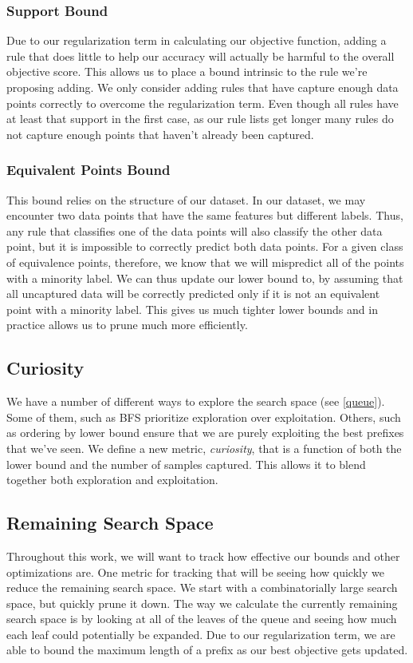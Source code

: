 \documentclass[]{article}
\theoremstyle{definition}
\begin{document}
\subsubsection{Support Bound}
Due to our regularization term in calculating our objective function, adding a rule that does little to help our accuracy will actually be harmful to the overall objective score.
This allows us to place a bound intrinsic to the rule we're proposing adding.
We only consider adding rules that have capture enough data points correctly to overcome the regularization term.
Even though all rules have at least that support in the first case, as our rule lists get longer many rules do not capture enough points that haven't already been captured.

\subsubsection{Equivalent Points Bound}
This bound relies on the structure of our dataset.
In our dataset, we may encounter two data points that have the same features but different labels.
Thus, any rule that classifies one of the data points will also classify the other data point, but it is impossible to correctly predict both data points.
For a given class of equivalence points, therefore, we know that we will mispredict all of the points with a minority label.
We can thus update our lower bound to, by assuming that all uncaptured data will be correctly predicted only if it is not an equivalent point with a minority label.
This gives us much tighter lower bounds and in practice allows us to prune much more efficiently.

\subsection{Curiosity}
We have a number of different ways to explore the search space (see \ref{queue}).
Some of them, such as BFS prioritize exploration over exploitation.
Others, such as ordering by lower bound ensure that we are purely exploiting the best prefixes that we've seen.
We define a new metric, \textit{curiosity}, that is a function of both the lower bound and the number of samples captured.
This allows it to blend together both exploration and exploitation.

\subsection{Remaining Search Space}
Throughout this work, we will want to track how effective our bounds and other optimizations are.
One metric for tracking that will be seeing how quickly we reduce the remaining search space.
We start with a combinatorially large search space, but quickly prune it down.
The way we calculate the currently remaining search space is by looking at all of the leaves of the queue and seeing how much each leaf could potentially be expanded.
Due to our regularization term, we are able to bound the maximum length of a prefix as our best objective gets updated.
\end{document}

